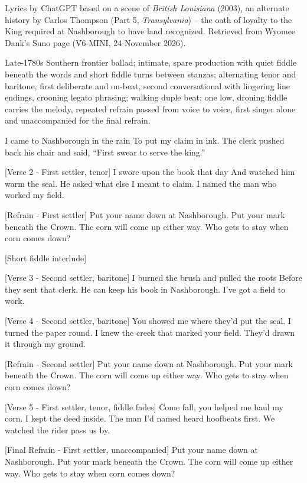 \begin{notes}
Lyrics by ChatGPT based on a scene of \emph{British Louisiana} (2003), an alternate history by Carlos Thompson (Part 5, \emph{Transylvania}) -- the oath of loyalty to the King required at Nashborough to have land recognized. Retrieved from Wyomee Dank's Suno page (V6-MINI, 24 November 2026).
\end{notes}
\begin{style}
Late-1780s Southern frontier ballad; intimate, spare production with quiet fiddle beneath the words and short fiddle turns between stanzas; alternating tenor and baritone, first deliberate and on-beat, second conversational with lingering line endings, crooning legato phrasing; walking duple beat; one low, droning fiddle carries the melody, repeated refrain passed from voice to voice, first singer alone and unaccompanied for the final refrain.
\end{style}
\begin{lyrics}
I came to Nashborough in the rain
To put my claim in ink.
The clerk pushed back his chair and said,
“First swear to serve the king.”

[Verse 2 - First settler, tenor]
I swore upon the book that day
And watched him warm the seal.
He asked what else I meant to claim.
I named the man who worked my field.

[Refrain - First settler]
Put your name down at Nashborough.
Put your mark beneath the Crown.
The corn will come up either way.
Who gets to stay when corn comes down?

[Short fiddle interlude]

[Verse 3 - Second settler, baritone]
I burned the brush and pulled the roots
Before they sent that clerk.
He can keep his book in Nashborough.
I’ve got a field to work.

[Verse 4 - Second settler, baritone]
You showed me where they’d put the seal.
I turned the paper round.
I knew the creek that marked your field.
They’d drawn it through my ground.

[Refrain - Second settler]
Put your name down at Nashborough.
Put your mark beneath the Crown.
The corn will come up either way.
Who gets to stay when corn comes down?

[Verse 5 - First settler, tenor, fiddle fades]
Come fall, you helped me haul my corn.
I kept the deed inside.
The man I’d named heard hoofbeats first.
We watched the rider pass us by.

[Final Refrain - First settler, unaccompanied]
Put your name down at Nashborough.
Put your mark beneath the Crown.
The corn will come up either way.
Who gets to stay when corn comes down?
\end{lyrics}

